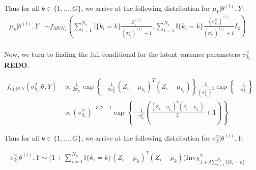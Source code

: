 \documentclass{article}
\begin{document}
Thus for all $k \in \{1, \ldots, G\}$, we arrive at the following distribution for $\mu_k | \theta^{(t)}, Y$:
\begin{align*}
\mu_{k}|\theta^{(t)},Y&\sim f_{{MVN}_d} \left(\sum_{i = 1}^{N_v}\mathbb{I}\{k_i = k\}\frac{Z_i^{(t)}}{(\sigma_{k_i}^2)^{(t)}+1}, \sum_{i = 1}^{N_v}\mathbb{I}\{k_i = k\}\frac{(\sigma_{k_i}^2)^{(t)}}{(\sigma_{k_i}^2)^{(t)}+1}I_2\right)\\
\end{align*}

Now, we turn to finding the full conditional for the latent variance parameters $\sigma_{k_i}^2$ \textbf{REDO}. 

\begin{align*}
f_{\sigma_{k_i}^2|\theta, Y}(\sigma_{k_i}^2|\theta, Y) &\propto \frac{1}{2\sigma_{k_i}}\exp\left\{-\frac{1}{2\sigma_{k_i}^2}(Z_i-\mu_{k_i})^T(Z_i-\mu_{k_i})\right\}\frac{1}{(\sigma_{k_i}^2)^2}\exp\left\{-\frac{1}{\sigma_{k_i}^2}\right\}\\
&\propto (\sigma_{k_i}^2)^{-3/2-1}\exp\left\{-\frac{1}{\sigma_{k_i}^2}\left(\frac{(Z_i-\mu_{k_i})^T(Z_i-\mu_{k_i})}{2}+1\right)\right\}
\end{align*}

Thus for all $k \in \{1, \ldots, G\}$, we arrive at the following distribution for $\sigma_k^2 | \theta^{(t)}, Y$:

\begin{align*}
\sigma_k^2 | \theta^{(t)}, Y \sim \Big(1 + \sum_{i=1}^{N_v}\mathbb{I}\{k_i = k\}(Z_i - \mu_k)^T(Z_i - \mu_k)\Big)\text{Inv}\chi^2_{1 + d\sum_{i=1}^{N_V}\mathbb{I}\{k_i = k\}}
\end{align*}
\end{document}
